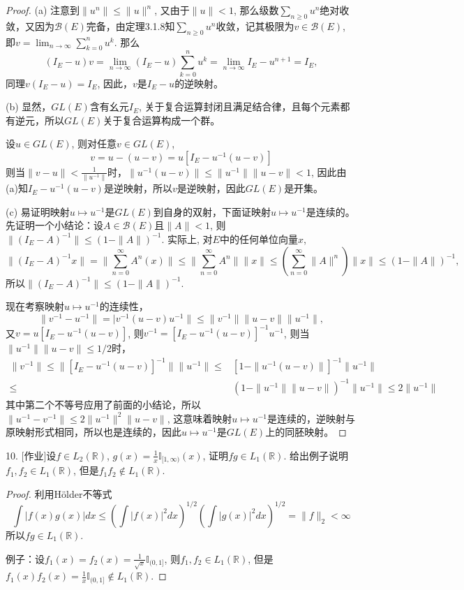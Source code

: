 \documentclass[a4paper,8pt]{ctexart}\textwidth 140mm \textheight 216mm
\newcommand{\8}{\infty}
\begin{document}
\begin{proof}
	(a) 注意到$\|u^n\|\leq \|u\|^n$, 又由于$\|u\|<1$, 那么级数$\sum_{n\geq 0}u^n$绝对收敛，又因为$\mathcal{B}(E)$完备，由定理3.1.8知$\sum_{n\geq 0}u^n$收敛，记其极限为$v\in \mathcal{B}(E)$, 即$v=\lim_{n\to\infty}\sum_{k=0}^nu^k$. 那么
	\[(I_E-u)v=\lim_{n\to\infty}(I_E-u)\sum_{k=0}^n u^k=\lim_{n\to\infty}I_E-u^{n+1}=I_E,\]
	同理$v(I_E-u)=I_E$, 因此，$v$是$I_E-u$的逆映射。
	
	(b) 显然，$GL(E)$含有幺元$I_E$, 关于复合运算封闭且满足结合律，且每个元素都有逆元，所以$GL(E)$关于复合运算构成一个群。
	
	设$u\in GL(E)$, 则对任意$v\in GL(E)$, 
	\[v=u-(u-v)=u[I_E-u^{-1}(u-v)]\]
	则当$\|v-u\|<\frac{1}{\|u^{-1}\|}$时，$\|u^{-1}(u-v)\|\leq \|u^{-1}\|\|u-v\|<1$, 因此由(a)知$I_E-u^{-1}(u-v)$是逆映射，所以$v$是逆映射，因此$GL(E)$是开集。
	
	(c) 易证明映射$u\mapsto u^{-1}$是$GL(E)$到自身的双射，下面证映射$u\mapsto u^{-1}$是连续的。先证明一个小结论：设$A\in \mathcal{B}(E)$且$\|A\|< 1$, 则$\|(I_E-A)^{-1}\|\leq (1-\|A\|)^{-1}$. 实际上, 对$E$中的任何单位向量$x$, 
	\begin{equation}
		\|(I_E-A)^{-1}x\|=\|\sum_{n=0}^\infty A^n(x)\|\leq\|\sum_{n=0}^\infty A^n\|\|x\| \leq (\sum_{n=0}^\infty\|A\|^n)\|x\|\leq (1-\|A\|)^{-1}, 
	\end{equation}
	所以$\|(I_E-A)^{-1}\|\leq (1-\|A\|)^{-1}$.
	
	现在考察映射$u\mapsto u^{-1}$的连续性，
	\[\|v^{-1}-u^{-1}\|=
	|v^{-1}(u-v)u^{-1}\|\leq \|v^{-1}\|\|u-v\|\|u^{-1}\|,\]
	又$v=u[I_E-u^{-1}(u-v)]$, 则$v^{-1}=[I_E-u^{-1}(u-v)]^{-1}u^{-1}$, 则当$\|u^{-1}\|\|u-v\|\leq1/2$时，
	\[\begin{aligned}
	\|v^{-1}\|\leq\|[I_E-u^{-1}(u-v)]^{-1}\|\|u^{-1}\|\leq & [1-\|u^{-1}(u-v)\|]^{-1}\|u^{-1}\|\\
	\leq & (1-\|u^{-1}\|\|u-v\|)^{-1}\|u^{-1}\|\leq 2\|u^{-1}\|
	\end{aligned}\]
	其中第二个不等号应用了前面的小结论，所以$\|u^{-1}-v^{-1}\|\leq 2\|u^{-1}\|^2\|u-v\|$, 这意味着映射$u\mapsto u^{-1}$是连续的，逆映射与原映射形式相同，所以也是连续的，因此$u\mapsto u^{-1}$是$GL(E)$上的同胚映射。
\end{proof}

10. [作业]设$f\in L_2(\mathbb{R})$, $g(x)=\frac{1}{x}\mathbb{I}_{[1,\infty)}(x)$, 证明$fg\in L_1(\mathbb{R})$. 给出例子说明$f_1,f_2\in L_1(\mathbb{R})$, 但是$f_1f_2\notin L_1(\mathbb{R})$. 
\begin{proof}
	利用H\"older不等式
	$$\int|f(x)g(x)|dx\leq (\int |f(x)|^2dx)^{1/2}(\int |g(x)|^2dx)^{1/2}=\|f\|_2<\infty$$
	所以$fg\in L_1(\mathbb{R})$.
	
	例子：设$f_1(x)=f_2(x)=\frac{1}{\sqrt{x}}\mathbb{I}_{(0,1]}$, 则$f_1,f_2\in L_1(\mathbb{R})$, 但是$f_1(x)f_2(x)=\frac{1}{x}\mathbb{I}_{(0,1]}\notin L_1(\mathbb{R})$.
\end{proof}
\end{document}
